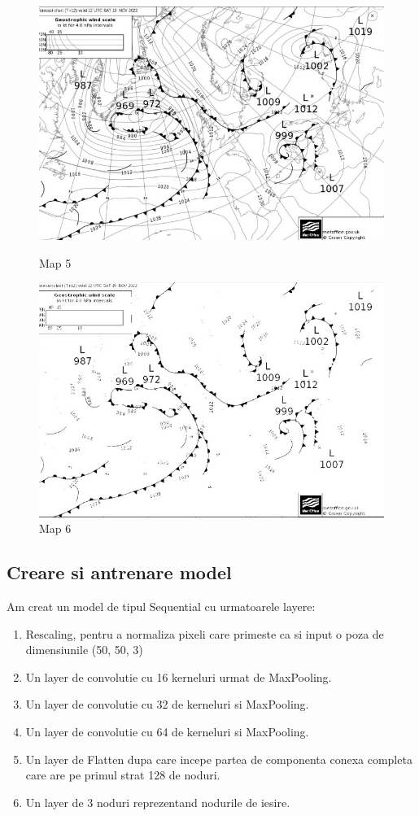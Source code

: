 \documentclass{article}
\begin{document}
\begin{figure}[!htb]
   \begin{minipage}{0.48\textwidth}
     \centering
     \includegraphics[width=.7\linewidth]{map5.jpg}
     \caption{Map 5}\label{Fig:Data5}
   \end{minipage}\hfill
   \begin{minipage}{0.48\textwidth}
     \centering
     \includegraphics[width=.7\linewidth]{map6.jpg}
     \caption{Map 6}\label{Fig:Data6}
   \end{minipage}
\end{figure}

\subsection{Creare si antrenare model}

Am creat un model de tipul Sequential cu urmatoarele layere:
\begin{enumerate}
  \item Rescaling, pentru a normaliza pixeli care primeste ca si input o poza de dimensiunile (50, 50, 3)
  \item Un layer de convolutie cu 16 kerneluri urmat de MaxPooling.
  \item Un layer de convolutie cu 32 de kerneluri si MaxPooling.
  \item Un layer de convolutie cu 64 de kerneluri si MaxPooling.
  \item Un layer de Flatten dupa care incepe partea de componenta conexa completa care are pe primul strat 128 de noduri.
  \item Un layer de 3 noduri reprezentand nodurile de iesire.
\end{enumerate}
\end{document}
